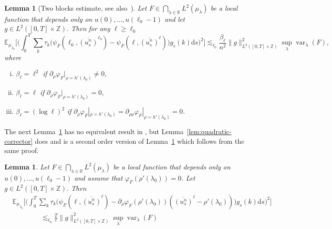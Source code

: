 \documentclass[11pt, a4paper]{article}
\newcommand{\mathd}{\mathrm{d}}
\newcommand{\tmop}[1]{\ensuremath{\operatorname{#1}}}
\newenvironment{enumerateroman}{\begin{enumerate}[i.] }{\end{enumerate}}
\newtheorem{lemma}[theorem]{Lemma}
\newcommand{\1}{\mathbf{1}}
\begin{document}
\begin{lemma}[Two blocks estimate, see also~{\cite[Lemma~3]{bib:goncalvesJara}}]
  \label{lem:two block}
  Let $F \in \bigcap_{\lambda \in \mathbb{R}} L^2 ({\mu}_{\lambda})$ be a
  local function that depends only on $u (0), \ldots, u (\ell_0 - 1)$ and let
  $g \in L^2 ([0, T] \times \mathbb{Z})$. Then for any $\ell \geqslant
  \ell_0$
  \[ \mathbb{E}_{{\mu}_{\lambda_0}} \Big[ \Big( \int_0^T \sum_k \tau_k
     \big( \psi_F ( \ell_0, \overline{(u^{n_{}}_s)}^{\ell_0} ) -
     \psi_F ( \ell, \overline{(u^{n_{}}_s)}^{\ell} ) \big) g_s
     (k) \mathd s \Big)^2 \Big] \lesssim_{\ell_0} \frac{\beta_{\ell}}{n^2}
     \| g \|_{L^2 ([0, T] \times \mathbb{Z})}^2 \sup_{\lambda}
     \tmop{var}_{\lambda} (F), \]
  where
  \begin{enumerateroman}
    \item $\beta_{\ell} = \ell^2$ if $\partial_{\rho} \varphi_F |_{\rho = h'
    (\lambda_0)} \neq 0$,
    
    \item $\beta_{\ell} = \ell$ if $\partial_{\rho} \varphi_F |_{\rho = h'
    (\lambda_0)} = 0$,
    
    \item $\beta_{\ell} = (\log \ell)^2$ if $\partial_{\rho} \varphi_F |_{\rho
    = h' (\lambda_0)} = \partial_{\rho \rho} \varphi_F |_{\rho = h'
    (\lambda_0)} = 0$.
  \end{enumerateroman}
\end{lemma}

The next Lemma~\ref{lem:linear} has no equivalent result in \cite{bib:goncalvesJara}, but Lemma~\ref{lem:quadratic-corrector} does and is a second order version of Lemma~\ref{lem:linear} which follows from the same proof.

\begin{lemma}
  \label{lem:linear}Let $F \in \bigcap_{\lambda \in \mathbb{R}} L^2
  ({\mu}_{\lambda})$ be a local function that depends only on $u (0),
  \ldots, u (\ell_0 - 1)$ and assume that $\varphi_F (\rho' (\lambda_0)) = 0$.
  Let $g \in L^2 ([0, T] \times \mathbb{Z})$. Then
  \begin{align*}
     &\mathbb{E}_{{\mu}_{\lambda_0}} \Big[ \Big( \int_0^T \sum_k \tau_k
     \big( \psi_F ( \ell, \overline{(u^{n_{}}_s)}^{\ell} ) -
     \partial_{\rho} \varphi_F (\rho' (\lambda_0)) (\overline{(u^n_s)}^{\ell}
     - \rho' (\lambda_0)) \big) g_s (k) \mathd s \Big)^2 \Big] \\
     & \hspace{50pt} \lesssim_{\ell_0} \frac{T}{\ell} \| g \|_{L^2 ([0, T] \times
     \mathbb{Z})}^2 \sup_{\lambda} \tmop{var}_{\lambda} (F) 
  \end{align*}
\end{lemma}
\end{document}

